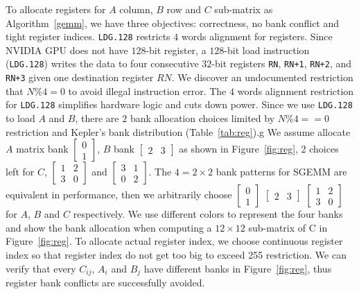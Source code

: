 To allocate registers for $A$ column, $B$ row and $C$ sub-matrix as Algorithm~\ref{gemm}, we have three objectives: correctness, no bank conflict and tight register indices.
{\tt LDG.128} restricts $4$ words alignment for registers.
Since NVIDIA GPU does not have $128$-bit register, a $128$-bit load instruction ({\tt LDG.128}) writes the data to four consecutive $32$-bit registers {\tt RN}, {\tt RN+1}, {\tt RN+2}, and {\tt RN+3} given one destination register $RN$.
We discover an undocumented restriction that $N\%4=0$ to avoid illegal instruction error.
The $4$ words alignment restriction for {\tt LDG.128} simplifies hardware logic and cuts down power.
Since we use {\tt LDG.128} to load $A$ and $B$, there are $2$ bank allocation choices limited by $N\%4==0$ restriction and Kepler's bank distribution (Table~\ref{tab:reg}).g
We assume allocate $A$ matrix bank $\begin{bmatrix} 0 \\ 1  \end{bmatrix}$,
    $B$ bank $\begin{bmatrix} 2 & 3 \end{bmatrix}$ as shown in Figure~\ref{fig:reg}, 2 choices left for $C$,
$\begin{bmatrix} 1 & 2 \\ 3 & 0  \end{bmatrix}$ and
$\begin{bmatrix} 3 & 1 \\ 0 & 2  \end{bmatrix}$.
The $4=2\times2$ bank patterns for SGEMM are equivalent in performance, then we arbitrarily
choose $\begin{bmatrix} 0 \\ 1  \end{bmatrix}$ $\begin{bmatrix} 2 & 3 \end{bmatrix}$
    $\begin{bmatrix} 1 & 2 \\ 3 & 0  \end{bmatrix}$ for $A$, $B$ and $C$ respectively.
We use different colors to represent the four banks and show the bank allocation when computing a $12 \times 12$ sub-matrix of C in Figure~\ref{fig:reg}.
To allocate actual register index, we choose continuous register index so that register index do not get too big to exceed 255 restriction. 
We can verify that every $C_{ij}$, $A_i$ and $B_j$ have different banks in Figure~\ref{fig:reg}, thus register bank conflicts are successfully avoided.

